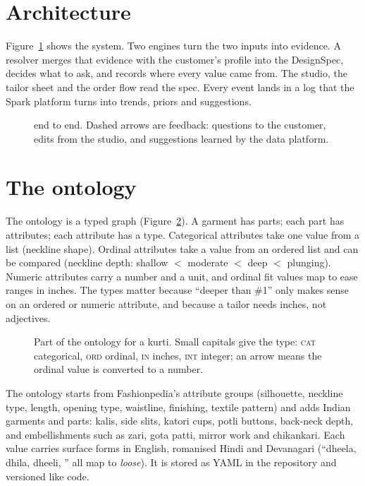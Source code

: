 \section{Architecture}

Figure~\ref{fig:arch} shows the system. Two engines turn the two inputs into evidence. A resolver merges that evidence with the customer's profile into the DesignSpec, decides what to ask, and records where every value came from. The studio, the tailor sheet and the order flow read the spec. Every event lands in a log that the Spark platform turns into trends, priors and suggestions.

\begin{figure}[p]
\centering
\caption{\sys{} end to end. Dashed arrows are feedback: questions to the customer, edits from the studio, and suggestions learned by the data platform.}\label{fig:arch}
\end{figure}

\section{The ontology}

The ontology is a typed graph (Figure~\ref{fig:onto}). A garment has parts; each part has attributes; each attribute has a type. Categorical attributes take one value from a list (neckline shape). Ordinal attributes take a value from an ordered list and can be compared (neckline depth: shallow $<$ moderate $<$ deep $<$ plunging). Numeric attributes carry a number and a unit, and ordinal fit values map to ease ranges in inches. The types matter because ``deeper than \#1'' only makes sense on an ordered or numeric attribute, and because a tailor needs inches, not adjectives.

\begin{figure}[h]
\centering
\caption{Part of the ontology for a kurti. Small capitals give the type: \textsc{cat} categorical, \textsc{ord} ordinal, \textsc{in} inches, \textsc{int} integer; an arrow means the ordinal value is converted to a number.}\label{fig:onto}
\end{figure}

The ontology starts from Fashionpedia's attribute groups (silhouette, neckline type, length, opening type, waistline, finishing, textile pattern) and adds Indian garments and parts: kalis, side slits, katori cups, potli buttons, back-neck depth, and embellishments such as zari, gota patti, mirror work and chikankari. Each value carries surface forms in English, romanised Hindi and Devanagari (``dheela, dhila, dheeli, '' all map to \emph{loose}). It is stored as YAML in the repository and versioned like code.

